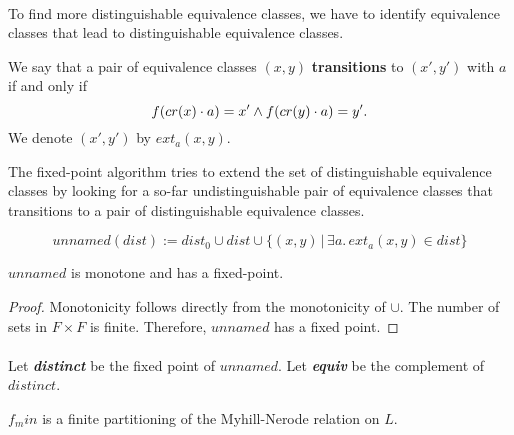 \paragraph{}
To find more distinguishable equivalence classes, we have to identify equivalence classes that lead to distinguishable equivalence classes. 
\begin{definition}
    We say that a pair of equivalence classes $(x,y)$ \textbf{transitions} to $(x', y')$ with $a$ if and only if
    \begin{equation*}
        f (cr(x)\cdot a) = x' \wedge f (cr(y) \cdot a) = y'.
    \end{equation*}
    We denote $(x', y')$ by $ext_a(x,y)$.
\end{definition}

The fixed-point algorithm tries to extend the set of distinguishable equivalence classes by looking for a so-far undistinguishable pair of equivalence classes that transitions to a pair of distinguishable equivalence classes.

\begin{definition}
    \begin{equation*}
        unnamed(dist) := dist_0 \cup dist \cup \{ (x,y) \, | \, \exists a. \, ext_a(x,y) \in dist\}
    \end{equation*}
\end{definition}

\begin{lemma}
    \label{dist_monotone}
    $unnamed$ is monotone and has a fixed-point.
\end{lemma}
\begin{proof}
    Monotonicity follows directly from the monotonicity of $\cup$. 
    The number of sets in $F \times F$ is finite. 
    Therefore, $unnamed$ has a fixed point.

\end{proof}
\paragraph{}
Let \textit{\textbf{distinct}} be the fixed point of $unnamed$.
Let \textit{\textbf{equiv}} be the complement of $distinct$.
\begin{theorem}
    \label{MN_MIN}
    $f_min$ is a finite partitioning of the Myhill-Nerode relation on $L$.
\end{theorem}




